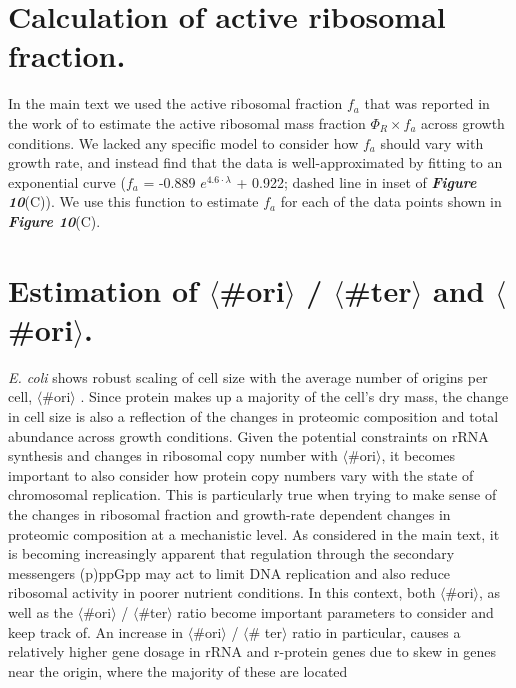 
\section{Calculation of active ribosomal fraction.}
\label{sec:SI_f_a}
In the main text we used the active ribosomal fraction $f_a$ that was reported
in the work of \cite{dai2016} to estimate the active ribosomal mass fraction
$\Phi_R \times f_a$ across growth conditions. We lacked any specific model to
consider how  $f_a$ should vary with growth rate, and instead find that the data
is well-approximated by fitting to an exponential curve ($f_a$ = -0.889 $e^{4.6
\cdot \lambda}$ + 0.922; dashed line in inset of \textbf{\textit{Figure 10}}(C)). We
use this function to estimate $f_a$ for each of the data points shown in
 \textbf{\textit{Figure 10}}(C).

\section{Estimation of $\langle$\#ori$\rangle$ / $\langle$\#ter$\rangle$ and $\langle$\#ori$\rangle$.}
\label{sec:SI_ori}
\textit{E. coli} shows robust scaling of cell size with the average number
of origins per cell, $\langle$\#ori$\rangle$ \citep{si2017}. Since protein makes
up a majority of the cell's dry mass, the change in cell size is also a
reflection of the changes in proteomic composition and total abundance across
growth conditions. Given the potential constraints on rRNA synthesis and changes
in ribosomal copy number with $\langle$\#ori$\rangle$, it becomes important to
also consider how protein copy numbers vary with the state of chromosomal
replication. This is particularly true  when trying to make sense of the changes
in ribosomal fraction and growth-rate dependent changes in proteomic composition
at a  mechanistic level.  As considered in the main text, it is becoming
increasingly apparent that regulation through the secondary messengers (p)ppGpp
may act to limit DNA replication and also reduce ribosomal activity in poorer
nutrient conditions.  In this context, both $\langle$\#ori$\rangle$, as well as
the $\langle$\#ori$\rangle$ / $\langle$\#ter$\rangle$ ratio become important
parameters to consider and keep track of. An increase in $\langle$\#ori$\rangle$
/ $\langle$\# ter$\rangle$ ratio  in particular, causes a relatively higher gene
dosage in rRNA and r-protein genes due to skew in genes near the origin, where
the majority of these are located

